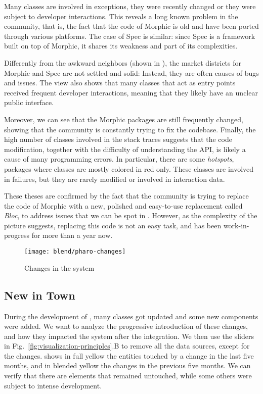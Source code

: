 Many classes are involved in exceptions, they were recently changed or they were subject to developer interactions.
This reveals a long known problem in the community, that is, the fact that the code of Morphic is old and have been ported through various platforms.
 The case of Spec is similar: since Spec is a framework built on top of Morphic, it shares its weakness and part of its complexities.

Differently from the awkward neighbors (shown in ), the market districts for Morphic and Spec are not settled and solid: Instead, they are often causes of bugs and issues.
The view also shows that many classes that act as entry points received frequent developer interactions, meaning that they likely have an unclear public interface.

Moreover, we can see that the Morphic packages are still frequently changed, showing that the community is constantly trying to fix the codebase.
Finally, the high number of classes involved in the stack traces suggests that the code modification, together with the difficulty of understanding the API, is likely a cause of many programming errors.
In particular, there are some \emph{hotspots}, \ie packages where classes are mostly colored in red only.
These classes are involved in failures, but they are rarely modified or involved in interaction data.

These theses are confirmed by the fact that the community is trying to replace the code of Morphic with a new, polished and easy-to-use replacement called \textit{Bloc}, to address issues that we can be spot in .
However, as the complexity of the picture suggests, replacing this code is not an easy task, and has been work-in-progress for more than a year now.



\begin{figure*}[ht]
\centering
\texttt{[image: blend/pharo-changes]}
\caption{Changes in the \pha system}
\label{fig:pharo-changes}
\end{figure*}

\subsection{New in Town}

During the development of , many classes got updated and some new components were added.
We want to analyze the progressive introduction of these changes, and how they impacted the system after the integration.
We then use the sliders in Fig.~\ref{fig:visualization-principles}.B to remove all the data sources, except for the changes.
 shows in full yellow the entities touched by a change in the last five months, and in blended yellow the changes in the previous five months.
We can verify that there are elements that remained untouched, while some others were subject to intense development.

